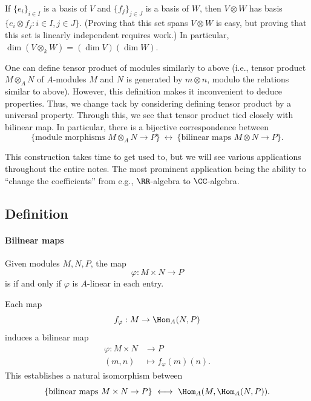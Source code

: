 If $\{e_i\}_{i\in I}$ is a basis of $V$
and $\{f_j\}_{j\in J}$ is a basis of $W$,
then $V\otimes W$ has basis $\{e_i\otimes f_j : i\in I, 
j\in J\}$.
(Proving that this set spans $V\otimes W$ is easy,
but proving that this set is linearly independent requires work.)
In particular, $\dim(V\otimes_k W) = (\dim V)(\dim W)$.

One can define tensor product of modules similarly
to above (i.e., tensor product $M\otimes_A N$ of $A$-modules 
$M$ and $N$ is generated by $m\otimes n$,
modulo the relations similar to above).
However, this definition makes it inconvenient to deduce
properties. Thus, we change tack by considering defining
tensor product by a universal property.
Through this, we see that tensor product 
tied closely with bilinear map. In particular,
there is a bijective correspondence between 
$$\{\text{module morphisms } M\otimes_A N\to P\}
\ \longleftrightarrow\ \{\text{bilinear maps } M\otimes N\to P\}.$$

This construction takes time to get used to,
but we will see various applications throughout the entire notes.
The most prominent application being the ability to 
``change the coefficients'' from e.g.,
$\RR$-algebra to $\CC$-algebra.
\subsection{Definition}
\paragraph{Bilinear maps}
\begin{definition}
    Given modules $M,N,P$, the map
    $$\varphi : M\times N\to P$$
    is  if and only if $\varphi$ is $A$-linear
    in each entry.
\end{definition}
Each map
$$f_\varphi : M\to \Hom_A(N,P)$$
induces a bilinear map
\begin{align*}
    \varphi : M\times N&\to P \\
	(m,n) &\mapsto f_\varphi(m)(n).
\end{align*}
This establishes a natural isomorphism between
\begin{equation}
\label{eq:bilinear_hom}
\{\text{bilinear maps }M\times N\to P\}
\ \longleftrightarrow\ 
\Hom_A(M,\Hom_A(N,P)).
\end{equation}
%
%
%
